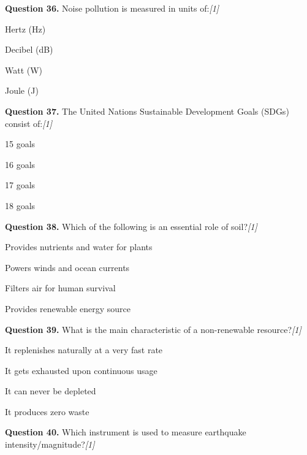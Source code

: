 \documentclass[11pt,a4paper]{article}
\newcommand{\pts}[1]{\hfill   \textit{[#1]}}
\begin{document}
\medskip


\noindent   \textbf{Question 36.} Noise pollution is measured in units of:\pts{1}

\begin{parts}
  \item Hertz (Hz)
  \item Decibel (dB)
  \item Watt (W)
  \item Joule (J)
\end{parts}

\medskip


\noindent   \textbf{Question 37.} The United Nations Sustainable Development Goals (SDGs) consist of:\pts{1}

\begin{parts}
  \item 15 goals
  \item 16 goals
  \item 17 goals
  \item 18 goals
\end{parts}

\medskip


\noindent   \textbf{Question 38.} Which of the following is an essential role of soil?\pts{1}

\begin{parts}
  \item Provides nutrients and water for plants
  \item Powers winds and ocean currents
  \item Filters air for human survival
  \item Provides renewable energy source
\end{parts}

\medskip


\noindent   \textbf{Question 39.} What is the main characteristic of a non-renewable resource?\pts{1}

\begin{parts}
  \item It replenishes naturally at a very fast rate
  \item It gets exhausted upon continuous usage
  \item It can never be depleted
  \item It produces zero waste
\end{parts}

\medskip


\noindent   \textbf{Question 40.} Which instrument is used to measure earthquake intensity/magnitude?\pts{1}
\end{document}
